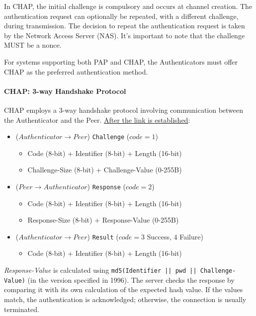 In CHAP, the initial challenge is compulsory and occurs at channel creation. The authentication request can optionally be repeated, with a different challenge, during transmission. The decision to repeat the authentication request is taken by the Network Access Server (NAS). It's important to note that the challenge MUST be a nonce.

For systems supporting both PAP and CHAP, the Authenticators must offer CHAP as the preferred authentication method.

\paragraph{CHAP: 3-way Handshake Protocol}
CHAP employs a 3-way handshake protocol involving communication between the Authenticator and the Peer.
\underline{After the link is established}:

\begin{itemize}
    \item ($Authenticator \rightarrow Peer$) \texttt{Challenge} ($code=1$)
          \begin{itemize}
              \item Code (8-bit) + Identifier (8-bit) + Length (16-bit)
              \item Challenge-Size (8-bit) + Challenge-Value (0-255B)
          \end{itemize}
    \item ($Peer \rightarrow Authenticator$) \texttt{Response} ($code=2$)
          \begin{itemize}
              \item Code (8-bit) + Identifier (8-bit) + Length (16-bit)
              \item Response-Size (8-bit) + Response-Value (0-255B)
          \end{itemize}
    \item ($Authenticator \rightarrow Peer$) \texttt{Result} ($code= 3$ Success, $4$ Failure)
          \begin{itemize}
              \item Code (8-bit) + Identifier (8-bit) + Length (16-bit)
          \end{itemize}
\end{itemize}

\textit{Response-Value} is calculated using \texttt{md5(Identifier || pwd || Challenge-Value)} (in the version specified in 1996). The server checks the response by comparing it with its own calculation of the expected hash value. If the values match, the authentication is acknowledged; otherwise, the connection is usually terminated.

